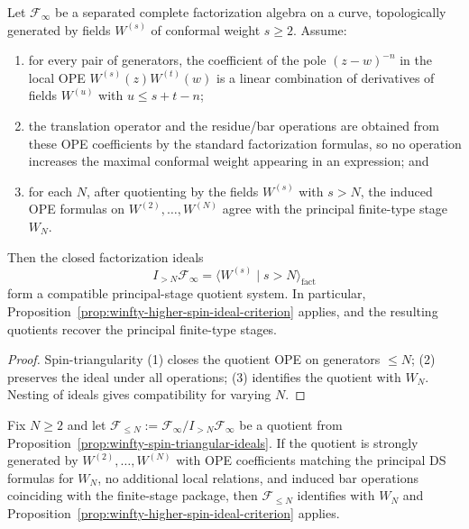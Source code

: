 \begin{proposition}
\label{prop:winfty-spin-triangular-ideals}
Let $\mathcal{F}_\infty$ be a separated complete factorization algebra
on a curve, topologically generated by fields $W^{(s)}$ of conformal
weight $s \ge 2$.  Assume:
\begin{enumerate}
\item for every pair of generators, the coefficient of the pole
  $(z-w)^{-n}$ in the local OPE
  $W^{(s)}(z)W^{(t)}(w)$ is a linear combination of derivatives of
  fields $W^{(u)}$ with $u \le s+t-n$;
\item the translation operator and the residue/bar operations are
  obtained from these OPE coefficients by the standard factorization
  formulas, so no operation increases the maximal conformal weight
  appearing in an expression; and
\item for each $N$, after quotienting by the fields $W^{(s)}$ with
  $s>N$, the induced OPE formulas on
  $W^{(2)},\dots,W^{(N)}$ agree with the principal finite-type stage
  $W_N$.
\end{enumerate}
Then the closed factorization ideals
\[
I_{>N}\mathcal{F}_\infty
= \langle W^{(s)} \mid s>N\rangle_{\mathrm{fact}}
\]
form a compatible principal-stage quotient system.  In particular,
Proposition~\ref{prop:winfty-higher-spin-ideal-criterion} applies, and
the resulting quotients recover the principal finite-type stages.
\end{proposition}

\begin{proof}
Spin-triangularity (1) closes the quotient OPE on generators $\le N$; (2) preserves the ideal under all operations; (3) identifies the quotient with $W_N$.  Nesting of ideals gives compatibility for varying $N$.
\end{proof}

\begin{proposition}
\label{prop:winfty-ds-coefficient-criterion}
Fix $N \ge 2$ and let
$\mathcal{F}_{\le N}:=\mathcal{F}_\infty/I_{>N}\mathcal{F}_\infty$
be a quotient from
Proposition~\ref{prop:winfty-spin-triangular-ideals}.
If the quotient is strongly generated by $W^{(2)},\dots,W^{(N)}$ with
OPE coefficients matching the principal DS formulas for $W_N$, no
additional local relations, and induced bar operations coinciding with
the finite-stage package, then $\mathcal{F}_{\le N}$ identifies with
$W_N$ and
Proposition~\ref{prop:winfty-higher-spin-ideal-criterion} applies.
\end{proposition}

